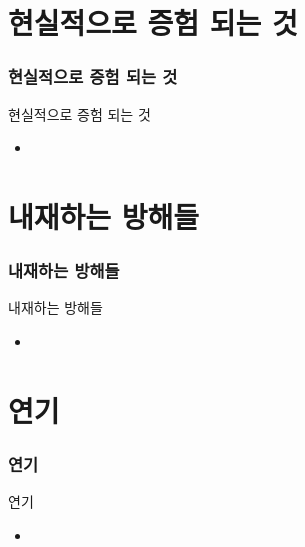 \documentclass[aspectratio=1610,17pt,xcolor=pdftex,dvipsnames,table,handout]{beamer}
\begin{document}
		\section{				현실적으로 증험 되는 것	}
		\begin{frame} [t,plain]					
		\frametitle{			현실적으로 증험 되는 것	}
			\begin{block} { 		현실적으로 증험 되는 것	}
			\setlength{\leftmargini}{2em}			
			\begin{itemize}
				\item 
			\end{itemize}
			\end{block}						
								
		\end{frame}						

		\section{				내재하는 방해들	}
		\begin{frame} [t,plain]					
		\frametitle{			내재하는 방해들	}
			\begin{block} { 		내재하는 방해들	}
			\setlength{\leftmargini}{2em}			
			\begin{itemize}
				\item 
			\end{itemize}
			\end{block}						
								
		\end{frame}						

		\section{				연기	}
		\begin{frame} [t,plain]					
		\frametitle{			연기	}
			\begin{block} { 		연기	}
			\setlength{\leftmargini}{2em}			
			\begin{itemize}
				\item 
			\end{itemize}
			\end{block}						
								
		\end{frame}						
\end{document}

